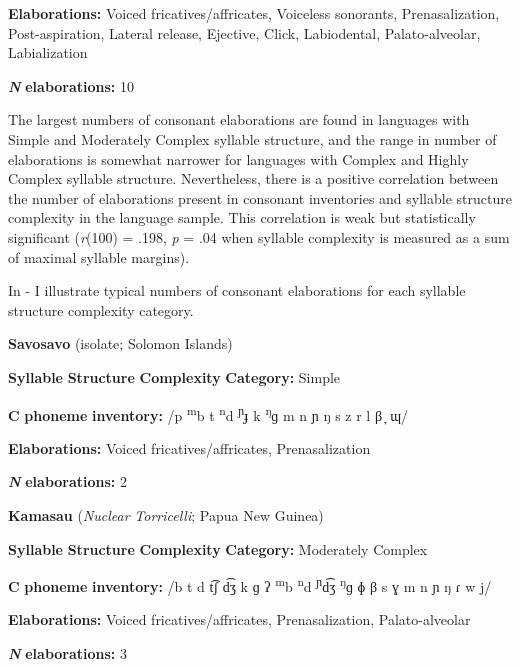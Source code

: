 \textbf{Elaborations:} Voiced fricatives/affricates, Voiceless sonorants, Prenasalization, Post-aspiration, Lateral release, Ejective, Click, Labiodental, Palato-alveolar, Labialization

\textbf{\textit{N}} \textbf{elaborations:} 10

\z

  The largest numbers of consonant elaborations are found in languages with Simple and Moderately Complex syllable structure, and the range in number of elaborations is somewhat narrower for languages with Complex and Highly Complex syllable structure. Nevertheless, there is a positive correlation between the number of elaborations present in consonant inventories and syllable structure complexity in the language sample. This correlation is weak but statistically significant (\textit{r}(100) = .198, \textit{p} = .04 when syllable complexity is measured as a sum of maximal syllable margins).

  In - I illustrate typical numbers of consonant elaborations for each syllable structure complexity category.

\ea\label{ex:(4.28)}
  \textbf{Savosavo} (isolate; Solomon Islands)

\textbf{Syllable} \textbf{Structure} \textbf{Complexity} \textbf{Category:} Simple

\textbf{C} \textbf{phoneme} \textbf{inventory:} /p \textsuperscript{m}b t \textsuperscript{n}d \textsuperscript{ɲ}ɟ k \textsuperscript{ŋ}ɡ m n ɲ ŋ s z r l β ̞ ɰ/

\textbf{Elaborations:} Voiced fricatives/affricates, Prenasalization

\textbf{\textit{N}} \textbf{elaborations:} 2

\z

\ea\label{ex:(4.29)}
  \textbf{Kamasau} (\textit{Nuclear} \textit{Torricelli}; Papua New Guinea)

\textbf{Syllable} \textbf{Structure} \textbf{Complexity} \textbf{Category:} Moderately Complex

\textbf{C} \textbf{phoneme} \textbf{inventory:} /b t d t͡ʃ d͡ʒ k ɡ ʔ \textsuperscript{m}b \textsuperscript{n}d \textsuperscript{ɲ}d͡ʒ \textsuperscript{ŋ}ɡ ɸ β s ɣ m n ɲ ŋ ɾ w j/

\textbf{Elaborations:} Voiced fricatives/affricates, Prenasalization, Palato-alveolar

\textbf{\textit{N}} \textbf{elaborations:} 3

\z

